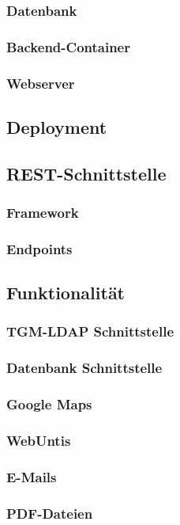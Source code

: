 		\subsubsection{Datenbank}
		\subsubsection{Backend-Container}
		\subsubsection{Webserver}
	\subsection{Deployment}
	\subsection{REST-Schnittstelle}
		\subsubsection{Framework}
		\subsubsection{Endpoints}
	\subsection{Funktionalität}
		\subsubsection{TGM-LDAP Schnittstelle}
		\subsubsection{Datenbank Schnittstelle}
		\subsubsection{Google Maps}
		\subsubsection{WebUntis}
		\subsubsection{E-Mails}
		\subsubsection{PDF-Dateien}